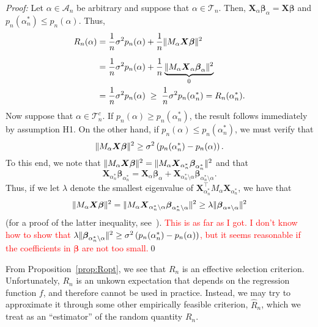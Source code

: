 \documentclass[11pt, letter paper]{article}
\newcommand{\1}{\mathmybb{1}}
\newcommand{\0}{\emptyset}
\newcommand{\paren}[1]{\left(#1 \right)}
\newcommand{\norm}[1]{|\hspace{-1pt}|#1 |\hspace{-1pt}|}
\newcommand{\normsq}[1]{\norm{#1}^{2}}
\newcommand{\Acal}{\mathcal{A}_{n}}
\newcommand{\Tcal}{\mathcal{T}_{n}}
\newcommand{\X}{\boldsymbol{X}}
\newcommand{\bbeta}{\boldsymbol{\beta}}
\begin{document}
\begin{myproofbox}
    \textit{Proof: }
    Let \(\alpha\in\Acal\) be arbitrary and suppose that \(\alpha\in\Tcal\). Then, \(\X_{\alpha}\bbeta_{\alpha} = \X\bbeta\) and \(p_{n}(\alpha_{n}^{*})\leq p_{n}(\alpha)\). Thus,
    \begin{align*}
        R_{n}(\alpha) &= \frac{1}{n}\sigma^{2}p_{n}(\alpha) + \frac{1}{n}\normsq{M_{\alpha}\X\bbeta}\\[2mm]
        &= \frac{1}{n} \sigma^{2}p_{n}(\alpha) + \frac{1}{n}\underbrace{\normsq{M_{\alpha}\X_{\alpha}\bbeta_{\alpha}}}_{0}\\
        &= \frac{1}{n}\sigma^{2}p_{n}(\alpha)\; \geq \; \frac{1}{n}\sigma^{2}p_{n}(\alpha_{n}^{*}) = R_{n}(\alpha_{n}^{*}).
    \end{align*}
    Now suppose that \(\alpha\in\Tcal^{c}\). If \(p_{n}(\alpha)\geq p_{n}(\alpha_{n}^{*})\), the result follows immediately by assumption H1. On the other hand, if \(p_{n}(\alpha)\leq p_{n}(\alpha_{n}^{*})\), we must verify that
    \begin{equation}\label{eq:Roptgoal}
        \normsq{M_{\alpha}\X\bbeta} \geq \sigma^{2}\paren{p_{n}(\alpha_{n}^{*}) - p_{n}(\alpha)}.
    \end{equation}
    To this end, we note that \(\normsq{M_{\alpha}\X\bbeta} = \normsq{M_{\alpha}\X_{\alpha_{n}^{*}}\bbeta_{\alpha_{n}^{*}}}\) and that 
    \[\X_{\alpha_{n}^{*}}\bbeta_{\alpha_{n}^{*}} = \X_{\alpha}\bbeta_{\alpha} + \X_{\alpha_{n}^{*}\setminus\alpha}\bbeta_{\alpha_{n}^{*}\setminus\alpha} .\]
    Thus, if we let \(\lambda\) denote the smallest eigenvalue of \(\X_{\alpha_{n}^{*}}^{\top}M_{\alpha}\X_{\alpha_{n}^{*}}\), we have that
    \[\normsq{M_{\alpha}\X\bbeta} = \normsq{M_{\alpha}\X_{\alpha_{n}^{*}\setminus\alpha}\bbeta_{\alpha_{n}^{*}\setminus\alpha}} \geq \lambda\normsq{\bbeta_{\alpha*\setminus\alpha}}\]
    (for a proof of the latter inequality, see~\textcite{hansen_2022}).
    \textcolor{red}{This is as far as I got. I don't know how to show that \(\lambda\normsq{\bbeta_{\alpha_{n}^{*}\setminus\alpha}}\geq \sigma^{2}\paren{p_{n}(\alpha_{n}^{*}) - p_{n}(\alpha)}\), but it seems reasonable if the coefficients in \(\bbeta\) are not too small.}\qed{}
\end{myproofbox}

From Proposition~\ref{prop:Ropt}, we see that \(R_{n}\) is an effective selection criterion. Unfortunately, \(R_{n}\) is an unkown expectation that depends on the regression function \(f\), and therefore cannot be used in practice. Instead, we may try to approximate it through some other empirically feasible criterion, \(\hat{R}_{n}\), which we treat as an ``estimator'' of the random quantity \(R_{n}\).
\end{document}
